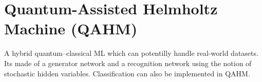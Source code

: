 \documentclass[conference]{IEEEtran}
\begin{document}
\section{Quantum-Assisted Helmholtz Machine (QAHM)}
A hybrid quantum–classical ML which can potentilly handle real-world datasets. Its made of a  generator network and a recognition network using the notion of stochastic hidden variables. Classification can also be implemented in QAHM.

\nocite{*}

\end{document}
